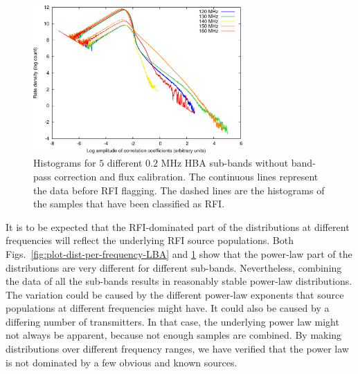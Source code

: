 \documentclass[useAMS,usenatbib]{mn2e}
\begin{document}
\begin{figure}
\begin{center}
\includegraphics[width=8cm]{img/plot-hba-dist-per-frequency-trimmed}
\caption{Histograms for $5$ different $0.2$ MHz HBA sub-bands without band-pass correction and flux calibration. The continuous lines represent the data before RFI flagging. The dashed lines are the histograms of the samples that have been classified as RFI.}
\label{fig:plot-dist-per-frequency-HBA}
\end{center}
\end{figure}

It is to be expected that the RFI-dominated part of the distributions at different frequencies will reflect the underlying RFI source populations. Both Figs.~\ref{fig:plot-dist-per-frequency-LBA} and \ref{fig:plot-dist-per-frequency-HBA} show that the power-law part of the distributions are very different for different sub-bands. Nevertheless, combining the data of all the sub-bands results in reasonably stable power-law distributions. The variation could be caused by the different power-law exponents that source populations at different frequencies might have. It could also be caused by a differing number of transmitters. In that case, the underlying power law might not always be apparent, because not enough samples are combined. By making distributions over different frequency ranges, we have verified that the power law is not dominated by a few obvious and known sources.
\end{document}
